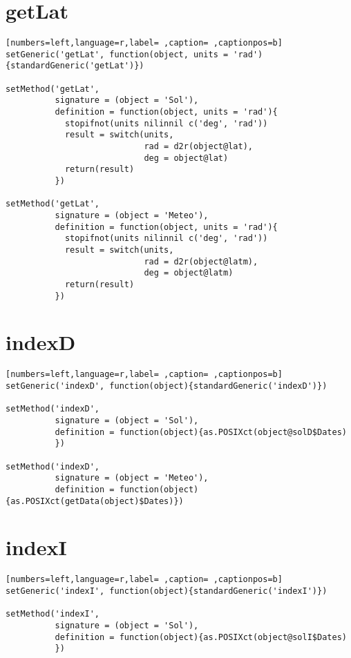 \section{getLat}
\label{sec:org73febc3}
\begin{lstlisting}[numbers=left,language=r,label= ,caption= ,captionpos=b]
setGeneric('getLat', function(object, units = 'rad')
{standardGeneric('getLat')})

setMethod('getLat',
          signature = (object = 'Sol'),
          definition = function(object, units = 'rad'){
            stopifnot(units nilinnil c('deg', 'rad'))
            result = switch(units,
                            rad = d2r(object@lat),
                            deg = object@lat)
            return(result)
          })

setMethod('getLat',
          signature = (object = 'Meteo'),
          definition = function(object, units = 'rad'){
            stopifnot(units nilinnil c('deg', 'rad'))
            result = switch(units,
                            rad = d2r(object@latm),
                            deg = object@latm)
            return(result)
          })
\end{lstlisting}
\section{indexD}
\label{sec:orgffaae77}
\begin{lstlisting}[numbers=left,language=r,label= ,caption= ,captionpos=b]
setGeneric('indexD', function(object){standardGeneric('indexD')})

setMethod('indexD',
          signature = (object = 'Sol'),
          definition = function(object){as.POSIXct(object@solD$Dates)
          })

setMethod('indexD',
          signature = (object = 'Meteo'),
          definition = function(object){as.POSIXct(getData(object)$Dates)})
\end{lstlisting}
\section{indexI}
\label{sec:org9ec2606}
\begin{lstlisting}[numbers=left,language=r,label= ,caption= ,captionpos=b]
setGeneric('indexI', function(object){standardGeneric('indexI')})

setMethod('indexI',
          signature = (object = 'Sol'),
          definition = function(object){as.POSIXct(object@solI$Dates)
          })
\end{lstlisting}
